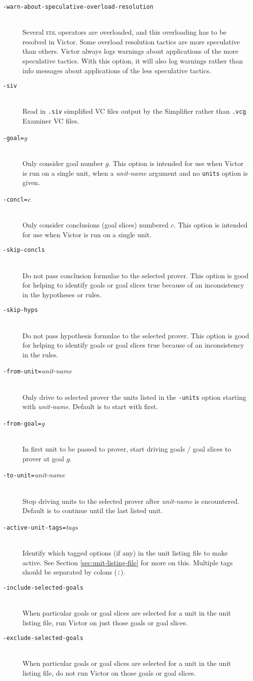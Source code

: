 \documentclass[12pt,fleqn]{article}
\newcommand{\fdl}{\textsc{fdl}}
\newcommand{\csv}{\textsc{vct}}
\newcommand{\optionb}[1]{\item[\texttt{-{#1}}]\ \\}
\newcommand{\optionv}[2]{\item[\texttt{-{#1}=}\mdseries\textit{#2}]\ \\}
\begin{document}
\begin{description}
  \optionb{warn-about-speculative-overload-resolution}
  Several \fdl{} operators are overloaded, and this overloading has to be
  resolved in Victor.  Some overload resolution tactics are more 
  speculative than others. Victor always logs warnings about applications
  of the more speculative tactics. With this option, it will also 
  log warnings rather than info messages about applications of the 
  less speculative tactics.

  \optionb{siv} Read in \texttt{.siv} simplified VC files output by the
     Simplifier rather than \texttt{.vcg} Examiner VC files.

\optionv{goal}{g} Only consider goal number $g$.
  This option is intended for use when Victor is run on a single unit,
  when a \textit{unit-name} argument and no \texttt{units} option is
  given.

\optionv{concl}{c} Only consider conclusions (goal slices) numbered $c$.  
  This option is intended for use when Victor is run on a single unit.

\optionb{skip-concls}
  Do not pass conclusion formulae to the selected prover.  This option is
  good for helping to identify goals or goal slices true because of an
  inconsistency in the hypotheses or rules.

\optionb{skip-hyps}
  Do not pass hypothesis formulae to the selected prover.  This option is
  good for helping to identify goals or goal slices true because of an
  inconsistency in the rules.

\optionv{from-unit}{unit-name}
  Only drive to selected prover the units listed in the \texttt{-units} option
  starting with \textit{unit-name}.  Default is to start with first. 

\optionv{from-goal}{g}
  In first unit to be passed to prover, start driving goals / goal
  slices to prover at goal $g$.

\optionv{to-unit}{unit-name}
  Stop driving units to the selected prover after \textit{unit-name} is 
  encountered. Default is to continue until the last listed unit.

\optionv{active-unit-tags}{tags}
  Identify which tagged options (if any) in the unit listing file to make
  active.  See Section \ref{sec:unit-listing-file} for more on this.
  Multiple tags should be separated by colons (\texttt{:}).

\optionb{include-selected-goals}
  When particular goals or goal slices are selected for a unit in the
  unit listing file, run Victor on just those goals or goal slices.

\optionb{exclude-selected-goals}
  When particular goals or goal slices are selected for a unit in the
  unit listing file, do not run Victor on those goals or goal slices.

\end{description}
\end{document}

